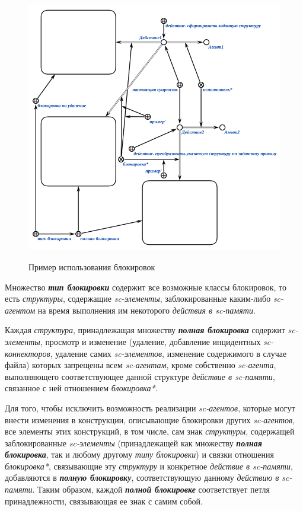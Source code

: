 \begin{figure}[h]
	\centering
	\caption{Пример использования блокировок}
	\includegraphics[scale=0.8]{images/part3/chapter_situation_management/lock.png}
	\label{fig:lock}
\end{figure}

Множество \textbf{\textit{тип блокировки}} содержит все возможные классы блокировок, то есть \textit{структуры}, содержащие \textit{sc-элементы}, заблокированные каким-либо \textit{sc-агентом} на время выполнения им некоторого \textit{действия в sc-памяти}.

Каждая \textit{структура}, принадлежащая множеству \textbf{\textit{полная блокировка}} содержит \textit{sc-элементы}, просмотр и изменение (удаление, добавление инцидентных \textit{sc-коннекторов}, удаление самих \textit{sc-элементов}, изменение содержимого в случае файла) которых запрещены всем \textit{sc-агентам}, кроме собственно \textit{sc-агента}, выполняющего соответствующее данной структуре \textit{действие в sc-памяти}, связанное с ней отношением \textit{блокировка*}.
	
Для того, чтобы исключить возможность реализации \textit{sc-агентов}, которые могут внести изменения в конструкции, описывающие блокировки других \textit{sc-агентов}, все элементы этих конструкций, в том числе, сам знак \textit{структуры}, содержащей заблокированные \textit{sc-элементы} (принадлежащей как множеству \textbf{\textit{полная блокировка}}, так и любому другому \textit{типу блокировки}) и связки отношения \textit{блокировка*}, связывающие эту \textit{структуру} и конкретное \textit{действие в sc-памяти}, добавляются в \textbf{\textit{полную блокировку}}, соответствующую данному \textit{действию в sc-памяти}. Таким образом, каждой \textbf{\textit{полной блокировке}} соответствует петля принадлежности, связывающая ее знак с самим собой.

